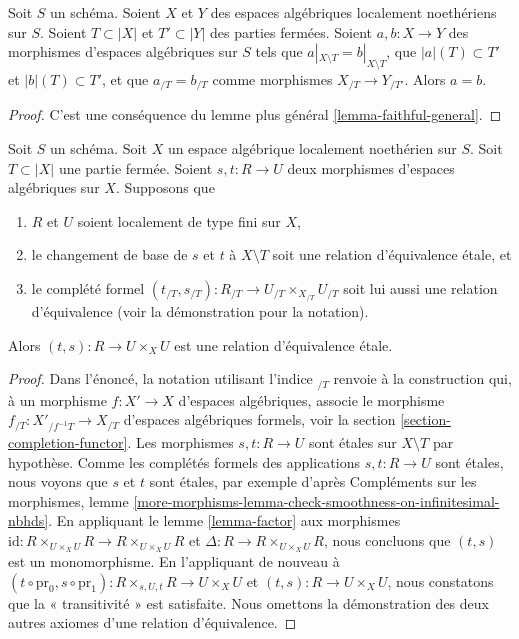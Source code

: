 \begin{lemma}
\label{lemma-faithful}
Soit $S$ un schéma. Soient $X$ et $Y$ des espaces algébriques localement
noethériens sur $S$. Soient $T \subset |X|$ et $T' \subset |Y|$ des parties
fermées. Soient $a, b : X \to Y$ des morphismes d'espaces algébriques sur
$S$ tels que $a|_{X \setminus T} = b|_{X \setminus T}$, que
$|a|(T) \subset T'$ et $|b|(T) \subset T'$, et que
$a_{/T} = b_{/T}$ comme morphismes $X_{/T} \to Y_{/T'}$.
Alors $a = b$.
\end{lemma}

\begin{proof}
C'est une conséquence du lemme plus général \ref{lemma-faithful-general}.
\end{proof}

\begin{lemma}
\label{lemma-equivalence-relation}
Soit $S$ un schéma. Soit $X$ un espace algébrique localement noethérien
sur $S$. Soit $T \subset |X|$ une partie fermée.
Soient $s, t : R \to U$ deux morphismes d'espaces algébriques sur $X$.
Supposons que
\begin{enumerate}
\item $R$ et $U$ soient localement de type fini sur $X$,
\item le changement de base de $s$ et $t$ à $X \setminus T$
soit une relation d'équivalence étale, et
\item le complété formel
$(t_{/T}, s_{/T}) : R_{/T} \to U_{/T} \times_{X_{/T}} U_{/T}$
soit lui aussi une relation d'équivalence (voir la démonstration pour la notation).
\end{enumerate}
Alors $(t, s) : R \to U \times_X U$ est une relation d'équivalence étale.
\end{lemma}

\begin{proof}
Dans l'énoncé, la notation utilisant l'indice ${}_{/T}$ renvoie à la
construction qui, à un morphisme $f : X' \to X$ d'espaces algébriques,
associe le morphisme $f_{/T} : X'_{/f^{-1}T} \to X_{/T}$ d'espaces
algébriques formels, voir la section \ref{section-completion-functor}.
Les morphismes $s, t : R \to U$ sont étales sur $X \setminus T$
par hypothèse. Comme les complétés formels des applications
$s, t : R \to U$ sont étales, nous voyons que $s$ et $t$ sont étales,
par exemple d'après Compléments sur les morphismes, lemme
\ref{more-morphisms-lemma-check-smoothness-on-infinitesimal-nbhds}.
En appliquant le lemme \ref{lemma-factor} aux morphismes
$\text{id} : R \times_{U \times_X U} R \to R \times_{U \times_X U} R$
et $\Delta : R \to R \times_{U \times_X U} R$, nous concluons que
$(t, s)$ est un monomorphisme. En l'appliquant de nouveau à
$(t \circ \text{pr}_0, s \circ \text{pr}_1) :
R \times_{s, U, t} R \to U \times_X U$ et $(t, s) : R \to U \times_X U$,
nous constatons que la « transitivité » est satisfaite. Nous omettons la
démonstration des deux autres axiomes d'une relation d'équivalence.
\end{proof}

